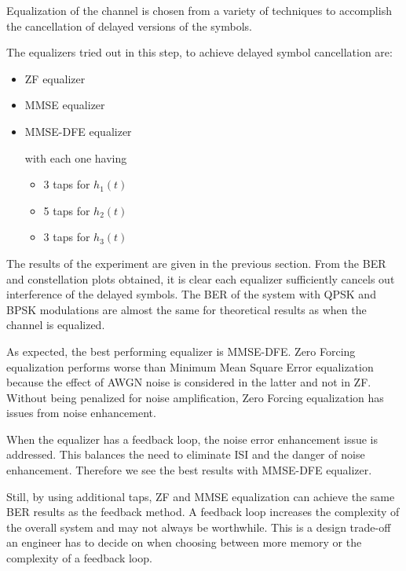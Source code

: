 \documentclass[]{article}
\begin{document}
Equalization of the channel is chosen from a variety of techniques to accomplish the cancellation of delayed versions of the symbols. 

The equalizers tried out in this step, to achieve delayed symbol cancellation are:

\begin{itemize}
\item ZF equalizer
\item MMSE equalizer
\item MMSE-DFE equalizer

with each one having
	\begin{itemize}
	\item 3 taps for $h_1(t)$
	\item 5 taps for $h_2(t)$
	\item 3 taps for $h_3(t)$
	\end{itemize}
\end{itemize}

The results of the experiment are given in the previous section. From the BER and constellation plots obtained, it is clear each equalizer sufficiently cancels out interference of the delayed symbols. The BER of the system with QPSK and BPSK modulations are almost the same for theoretical results as when the channel is equalized. 

As expected, the best performing equalizer is MMSE-DFE.  Zero Forcing equalization performs worse than Minimum Mean Square Error equalization because the effect of AWGN noise is considered in the latter and not in ZF.  Without being penalized for noise amplification, Zero Forcing equalization has issues from noise enhancement. 

When the equalizer has a feedback loop, the noise error enhancement issue is addressed. This balances the need to eliminate ISI and the danger of noise enhancement. Therefore we see the best results with MMSE-DFE equalizer.

Still, by using additional taps, ZF and MMSE equalization can achieve the same BER results as the feedback method.  A feedback loop increases the complexity of the overall system and may not always be worthwhile. This is a design trade-off an engineer has to decide on when choosing between more memory or the complexity of a feedback loop.

\appendix
\newpage


\newpage
%
\end{document}
